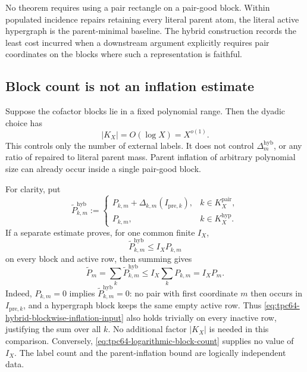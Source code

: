 No theorem requires using a pair rectangle on a pair-good block.  Within
populated incidence repairs retaining every literal parent atom, the
literal active hypergraph is the parent-minimal baseline.  The
hybrid construction records the least cost incurred when a downstream
argument explicitly requires pair coordinates on the blocks where such a
representation is faithful.

\subsection{Block count is not an inflation estimate}

Suppose the cofactor blocks lie in a fixed polynomial range.  Then the
dyadic choice has
\begin{equation}
 |K_X|=O(\log X)=X^{o(1)}.
 \label{eq:tpc64-logarithmic-block-count}
\end{equation}
This controls only the number of external labels.  It does not control
\(\Delta_m^{\mathrm{hyb}}\), or any ratio of repaired to literal parent
mass.  Parent inflation of arbitrary polynomial size can already occur
inside a single pair-good block.

For clarity, put
\begin{equation}
 \widetilde P_{k,m}^{\mathrm{hyb}}
 :=
 \begin{cases}
  P_{k,m}+\Delta_{k,m}(I_{\mathrm{pre},k}),
      &k\in K_X^{\mathrm{pair}},\\
  P_{k,m},&k\in K_X^{\mathrm{hyp}}.
 \end{cases}
 \label{eq:tpc64-hybrid-block-parent-weight}
\end{equation}
If a separate estimate proves, for one common finite \(I_X\),
\begin{equation}
 \widetilde P_{k,m}^{\mathrm{hyb}}
 \le I_XP_{k,m}
 \label{eq:tpc64-hybrid-blockwise-inflation-input}
\end{equation}
on every block and active row, then summing gives
\begin{equation}
 \widetilde P_m
 =\sum_k\widetilde P_{k,m}^{\mathrm{hyb}}
 \le I_X\sum_kP_{k,m}
 =I_XP_m.
 \label{eq:tpc64-blockwise-to-global-inflation}
\end{equation}
Indeed, \(P_{k,m}=0\) implies
\(\widetilde P_{k,m}^{\mathrm{hyb}}=0\): no pair with first coordinate
\(m\) then occurs in \(I_{\mathrm{pre},k}\), and a hypergraph block keeps
the same empty active row.  Thus
\eqref{eq:tpc64-hybrid-blockwise-inflation-input} also holds trivially on
every inactive row, justifying the sum over all \(k\).
No additional factor \(|K_X|\) is needed in this comparison.  Conversely,
\eqref{eq:tpc64-logarithmic-block-count} supplies no value of \(I_X\).
The label count and the parent-inflation bound are logically independent
data.

